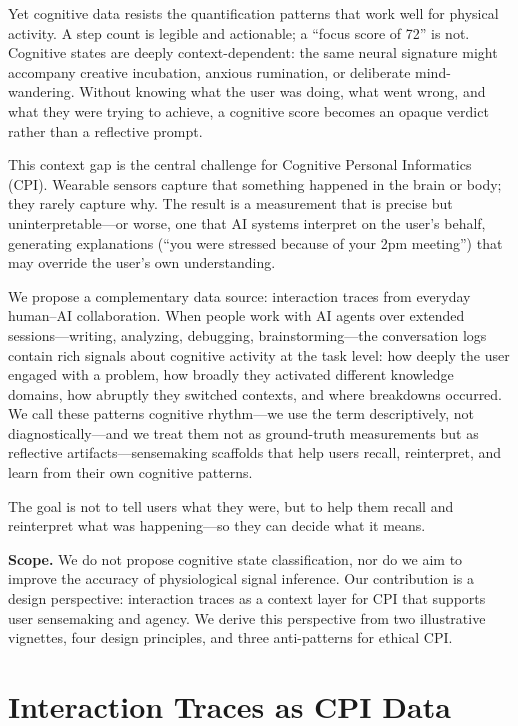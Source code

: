 \documentclass[10pt]{article}
\begin{document}
Yet cognitive data resists the quantification patterns that work well for physical activity. A step count is legible and actionable; a ``focus score of 72'' is not. Cognitive states are deeply context-dependent: the same neural signature might accompany creative incubation, anxious rumination, or deliberate mind-wandering. Without knowing what the user was doing, what went wrong, and what they were trying to achieve, a cognitive score becomes an opaque verdict rather than a reflective prompt.

This context gap is the central challenge for Cognitive Personal Informatics (CPI). Wearable sensors capture that something happened in the brain or body; they rarely capture why. The result is a measurement that is precise but uninterpretable---or worse, one that AI systems interpret on the user's behalf, generating explanations (``you were stressed because of your 2pm meeting'') that may override the user's own understanding.

We propose a complementary data source: interaction traces from everyday human--AI collaboration. When people work with AI agents over extended sessions---writing, analyzing, debugging, brainstorming---the conversation logs contain rich signals about cognitive activity at the task level: how deeply the user engaged with a problem, how broadly they activated different knowledge domains, how abruptly they switched contexts, and where breakdowns occurred. We call these patterns cognitive rhythm---we use the term descriptively, not diagnostically---and we treat them not as ground-truth measurements but as reflective artifacts---sensemaking scaffolds that help users recall, reinterpret, and learn from their own cognitive patterns.

The goal is not to tell users what they were, but to help them recall and reinterpret what was happening---so they can decide what it means.

\textbf{Scope.} We do not propose cognitive state classification, nor do we aim to improve the accuracy of physiological signal inference. Our contribution is a design perspective: interaction traces as a context layer for CPI that supports user sensemaking and agency. We derive this perspective from two illustrative vignettes, four design principles, and three anti-patterns for ethical CPI.

\section{Interaction Traces as CPI Data}
\end{document}
